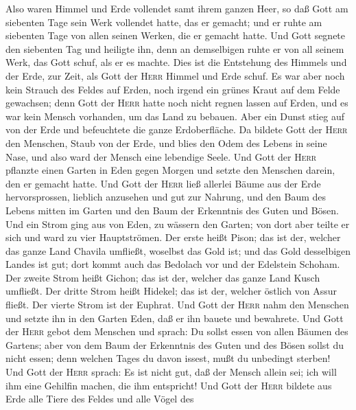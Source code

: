  Also waren Himmel und Erde vollendet samt ihrem ganzen
Heer,  so daß Gott am siebenten Tage sein Werk vollendet
hatte, das er gemacht; und er ruhte am siebenten Tage von allen seinen
Werken, die er gemacht hatte.  Und Gott segnete den
siebenten Tag und heiligte ihn, denn an demselbigen ruhte er von all
seinem Werk, das Gott schuf, als er es machte.  Dies ist
die Entstehung des Himmels und der Erde, zur Zeit, als Gott der
\textsc{Herr} Himmel und Erde schuf.  Es war aber noch
kein Strauch des Feldes auf Erden, noch irgend ein grünes Kraut auf dem
Felde gewachsen; denn Gott der \textsc{Herr} hatte noch nicht regnen
lassen auf Erden, und es war kein Mensch vorhanden, um das Land zu
bebauen.  Aber ein Dunst stieg auf von der Erde und
befeuchtete die ganze Erdoberfläche.  Da bildete Gott der
\textsc{Herr} den Menschen, Staub von der Erde, und blies den Odem des
Lebens in seine Nase, und also ward der Mensch eine lebendige Seele.
 Und Gott der \textsc{Herr} pflanzte einen Garten in Eden
gegen Morgen und setzte den Menschen darein, den er gemacht hatte.
 Und Gott der \textsc{Herr} ließ allerlei Bäume aus der
Erde hervorsprossen, lieblich anzusehen und gut zur Nahrung, und den
Baum des Lebens mitten im Garten und den Baum der Erkenntnis des Guten
und Bösen.  Und ein Strom ging aus von Eden, zu wässern
den Garten; von dort aber teilte er sich und ward zu vier Hauptströmen.
 Der erste heißt Pison; das ist der, welcher das ganze
Land Chavila umfließt, woselbst das Gold ist;  und das
Gold desselbigen Landes ist gut; dort kommt auch das Bedolach vor und
der Edelstein Schoham.  Der zweite Strom heißt Gichon;
das ist der, welcher das ganze Land Kusch umfließt.  Der
dritte Strom heißt Hidekel; das ist der, welcher östlich von Assur
fließt. Der vierte Strom ist der Euphrat.  Und Gott der
\textsc{Herr} nahm den Menschen und setzte ihn in den Garten Eden, daß
er ihn bauete und bewahrete.  Und Gott der \textsc{Herr}
gebot dem Menschen und sprach: Du sollst essen von allen Bäumen des
Gartens;  aber von dem Baum der Erkenntnis des Guten und
des Bösen sollst du nicht essen; denn welchen Tages du davon issest,
mußt du unbedingt sterben!  Und Gott der \textsc{Herr}
sprach: Es ist nicht gut, daß der Mensch allein sei; ich will ihm eine
Gehilfin machen, die ihm entspricht!  Und Gott der
\textsc{Herr} bildete aus Erde alle Tiere des Feldes und alle Vögel des
